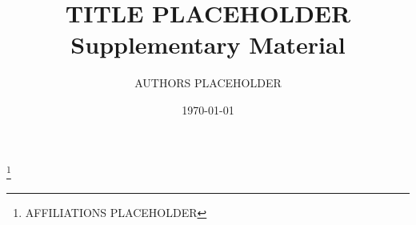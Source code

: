 \documentclass[12pt]{article}
\newcommand\blfootnote[1]{%
	\begingroup
	\renewcommand\thefootnote{}\footnote{#1}%
	\addtocounter{footnote}{-1}%
	\endgroup
}
\begin{document}
\title{\LARGE TITLE PLACEHOLDER\\
Supplementary Material}
\author{AUTHORS PLACEHOLDER}
\date{\today}
\maketitle\blfootnote{AFFILIATIONS PLACEHOLDER}

\vspace{-0.1in}




\end{document}
